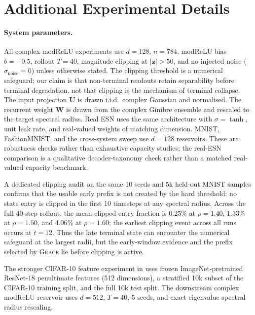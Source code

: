 \documentclass{article}
\theoremstyle{remark}
\newcommand{\bz}{\mathbf{z}}
\newcommand{\bW}{\mathbf{W}}
\newcommand{\bU}{\mathbf{U}}
\newcommand{\grace}{\textnormal{\textsc{Grace}}}
\begin{document}

\appendix

\section{Additional Experimental Details}
\label{app:details}

\paragraph{System parameters.}
All complex modReLU experiments use $d = 128$, $n = 784$, modReLU bias
$b = -0.5$, rollout $T = 40$, magnitude clipping at $|\bz| > 50$, and no
injected noise ($\sigma_{\text{noise}} = 0$) unless otherwise stated. The
clipping threshold is a
numerical safeguard; our claim is that non-terminal readouts retain
separability before terminal degradation, not that clipping is the mechanism
of terminal collapse. The input projection $\bU$
is drawn i.i.d.\ complex Gaussian and normalised. The recurrent weight
$\bW$ is drawn from the complex Ginibre ensemble and rescaled to the target
spectral radius. Real ESN uses the same architecture with $\sigma = \tanh$,
unit leak rate, and real-valued weights of matching dimension.
MNIST, FashionMNIST, and the cross-system sweep use $d=128$ reservoirs. These
are robustness checks rather than exhaustive capacity studies; the real-ESN
comparison is a qualitative decoder-taxonomy check rather than a matched
real-valued capacity benchmark.

A dedicated clipping audit on the same 10 seeds and 5k held-out MNIST samples
confirms that the usable early prefix is not created by the hard threshold:
no state entry is clipped in the first 10 timesteps at any spectral radius.
Across the full 40-step rollout, the mean clipped-entry fraction is
$0.25\%$ at $\rho=1.40$, $1.33\%$ at $\rho=1.50$, and $4.06\%$ at
$\rho=1.60$; the earliest clipping event across all runs occurs at
$t=12$. Thus the late terminal state can encounter the numerical
safeguard at the largest radii, but the early-window evidence and the
prefix selected by \grace{} lie before clipping is active.

The stronger CIFAR-10 feature experiment in  uses
frozen ImageNet-pretrained ResNet-18 penultimate features (512 dimensions),
a stratified 10k subset of the CIFAR-10 training split, and the full 10k
test split. The downstream complex modReLU reservoir uses $d=512$, $T=40$,
5 seeds, and exact eigenvalue spectral-radius rescaling.
\end{document}
